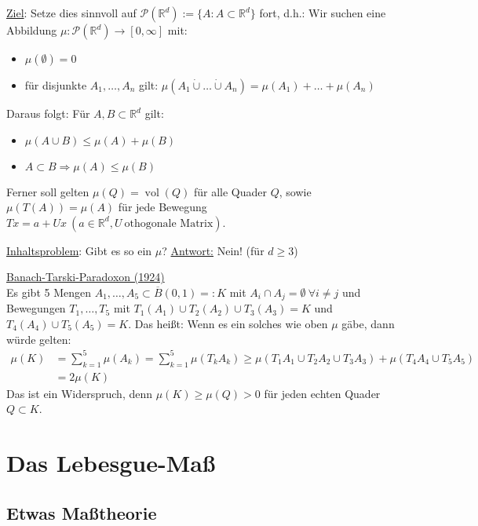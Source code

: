 \documentclass[a4paper]{scrreprt}
\newcommand{\PowerSet}{\mathcal{P}}
\newcommand{\R}{\mathbb{R}}
\newcommand{\dcup}{\dot{\cup}}
\theoremstyle{plain}
\theoremstyle{definition}
\begin{document}
\uline{Ziel}: Setze dies sinnvoll auf $\PowerSet(\R^d) := \{A : A \subset \R^d\}$ fort, d.h.: Wir suchen eine Abbildung $\mu:\PowerSet(\R^d) \rightarrow [0,\infty]$ mit:
\begin{itemize}
 \item $\mu(\emptyset) = 0$
 \item für disjunkte $A_1, \dots, A_n$ gilt: $\mu(A_1 \dcup \dots \dcup A_n) = \mu(A_1) + \dots + \mu(A_n)$
\end{itemize}
Daraus folgt: Für $A,B \subset \R^d$ gilt:
\begin{itemize}
    \item $\mu(A \cup B) \le \mu(A) + \mu(B)$
    \item $A \subset B \Rightarrow \mu(A) \le \mu(B)$
\end{itemize}
Ferner soll gelten $\mu(Q) = \operatorname{vol}(Q)$ für alle Quader $Q$, sowie $\mu(T(A)) = \mu(A)$ für jede Bewegung $Tx = a + Ux \ (a \in \R^d, U \ \text{othogonale Matrix})$.

\vspace{12pt}

\uline{Inhaltsproblem}: Gibt es so ein $\mu$? \uline{Antwort:} Nein! (für $d \ge 3$)

\vspace{12pt}

\uline{Banach-Tarski-Paradoxon (1924)}\\
Es gibt 5 Mengen $A_1, \dots, A_5 \subset \overline{B}(0,1) =: K$ mit $A_i \cap A_j = \emptyset \ \forall i \ne j$ und Bewegungen $T_1,\dots, T_5$ mit $T_1(A_1) \cup T_2(A_2) \cup T_3(A_3) = K$ und $T_4(A_4) \cup T_5(A_5) = K$.
Das heißt: Wenn es ein solches wie oben $\mu$ gäbe, dann würde gelten:
\begin{displaymath}
    \begin{split}
        \mu(K) &= \sum_{k=1}^5 \mu(A_k) = \sum_{k=1}^5 \mu(T_k A_k) \ge \mu(T_1 A_1 \cup T_2 A_2 \cup T_3 A_3) + \mu(T_4 A_4 \cup T_5 A_5) \\
        &= 2 \mu(K) 
    \end{split}
\end{displaymath} 
Das ist ein Widerspruch, denn $\mu(K) \ge \mu(Q) > 0$ für jeden echten Quader $Q \subset K$.

\chapter{Das Lebesgue-Maß}
\section{Etwas Maßtheorie}
\end{document}
